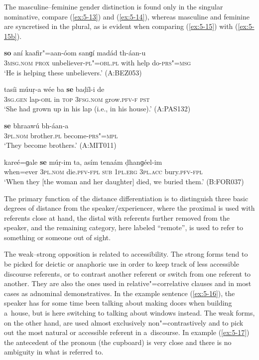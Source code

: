 The masculine--feminine gender distinction is found only in the singular nominative, compare (\ref{ex:5-13}) and (\ref{ex:5-14}), whereas masculine and feminine are syncretised in the plural, as is evident when comparing (\ref{ex:5-15}) with (\ref{ex:5-15b}). 


\begin{exe}
\ex
\label{ex:5-13}
\gll \textbf{so} aní kaafir"=aan-óom sanɡí madád th-áan-u \\
\textsc{3msg}.\textsc{nom} \textsc{prox} unbeliever-\textsc{pl"=obl.pl} with help do-\textsc{prs"=msg}\\
\glt `He is helping these unbelievers.' (A:BEZ053)

\ex
\label{ex:5-14}
\gll tasíi múuṛ-a wée ba \textbf{se} baḍíl-i de \\
\textsc{3sg}.\textsc{gen} lap-\textsc{obl} in \textsc{top} \textsc{3fsg}.\textsc{nom}
grow.\textsc{pfv-f} \textsc{pst}\\
\glt `She had grown up in his lap (i.e., in his house).' (A:PAS132)

\ex
\label{ex:5-15}
\gll \textbf{se} bhraawú bh-áan-a\\
\textsc{3pl}.\textsc{nom} brother.\textsc{pl} become-\textsc{prs"=mpl}\\
\glt `They become brothers.' (A:MIT011)

\ex
\label{ex:5-15b}
\gll kareé=ɡale \textbf{se} múṛ-im ta, asím  tenaám ḍhanɡéel-im\\
when=ever \textsc{3pl.nom} die.\textsc{pfv}-\textsc{fpl} \textsc{sub} \textsc{1pl.erg} \textsc{3pl.acc} bury.\textsc{pfv}-\textsc{fpl} \\
\glt `When they [the woman and her daughter] died, we buried them.' (B:FOR037)
\end{exe}


The primary function of the distance differentiation is to distinguish three basic degrees of distance from the speaker/experiencer, where the proximal is used with referents close at hand, the distal with referents further removed from the speaker, and the remaining category, here labeled ``remote'', is used to refer to something or someone out of sight. 


The weak--strong opposition is related to accessibility. The strong forms tend to be picked for deictic or anaphoric use in order to keep track of less accessible discourse referents, or to contrast another referent or switch from one referent to another. They are also the ones used in relative"=correlative clauses and in most cases as adnominal demonstratives. In the example sentence (\ref{ex:5-16}), the speaker has for some time been talking about making doors when building a~house, but is here switching to talking about windows instead. The weak forms, on the other hand, are used almost exclusively non"=contrastively and to pick out the most natural or accessible referent in a~discourse. In example (\ref{ex:5-17}) the antecedent of the pronoun (the cupboard) is very close and there is no ambiguity in what is referred to.


